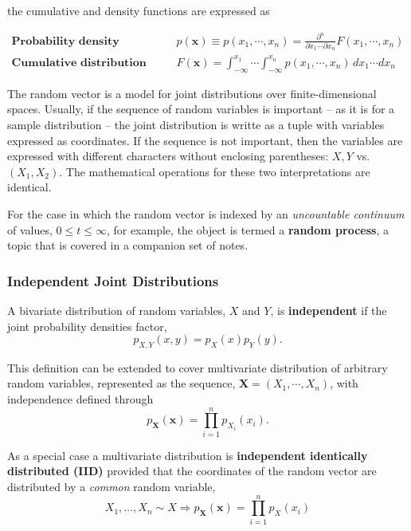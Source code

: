 \documentclass[12pt, twoside, draft]{article}
\begin{document}
the cumulative and density functions are expressed as

\begin{align}
\textbf{Probability density function: } & p(\mathbf{x}) \equiv p(x_1, \cdots, x_n) = \frac{\partial^n}{\partial x_1 \cdots \partial x_n} F(x_1, \cdots, x_n) \\
\textbf{Cumulative distribution function: } & F(\mathbf{x}) = \int_{-\infty}^{x_1} \cdots \int_{-\infty}^{x_n} p(x_1, \cdots, x_n) \,dx_1 \cdots dx_n
\end{align}

The random vector is a model for joint distributions over finite-dimensional spaces.  Usually, if the sequence of random variables is important -- as it is for a sample distribution -- the joint distribution is writte as a tuple with variables expressed as coordinates.  If the sequence is not important, then the variables are expressed with different characters without enclosing parentheses: $X, Y$ vs. $(X_1, X_2)$.  The mathematical operations for these two interpretations are identical. 

 For the case in which the random vector is indexed by an \textit{uncountable continuum} of values, $0 \leq t \leq \infty$, for example, the object is termed a \textbf{random process}, a topic that is covered in a companion set of notes.

\subsubsection{Independent Joint Distributions}\label{sec:independent_joint_distributions}

A bivariate distribution of random variables, $X$ and $Y$, is \textbf{independent} if the joint probability densities factor,
\begin{equation}\label{eq:independent_density_function}
p_{X,Y}(x,y) = p_X(x)p_Y(y).
\end{equation}

This definition can be extended to cover multivariate distribution of arbitrary random variables, represented as the sequence, $\mathbf{X} = \left(X_1 , \cdots, X_n\right)$, with independence defined through
\begin{equation}
p_{\mathbf{X}} (\mathbf{x}) = \prod_{i=1}^n p_{X_i}(x_i).
\end{equation}

As a special case a multivariate distribution is \textbf{independent identically distributed (IID)} provided that the coordinates of the random vector are distributed by a \textit{common} random variable,
\begin{equation}
X_1, \ldots, X_n \sim X \Rightarrow p_{\mathbf{X}} (\mathbf{x}) = \prod_{i=1}^n p_{X}(x_i)
\end{equation}
\end{document}
